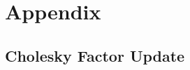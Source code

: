 \documentclass{acmsmall}
\begin{document}
% 
% 
% 
% 


\appendix

\section{Appendix} \label{sec:Appendix}

\subsection{Cholesky Factor Update} \label{sec:CholeskyUpdate}

\small
\end{document}
